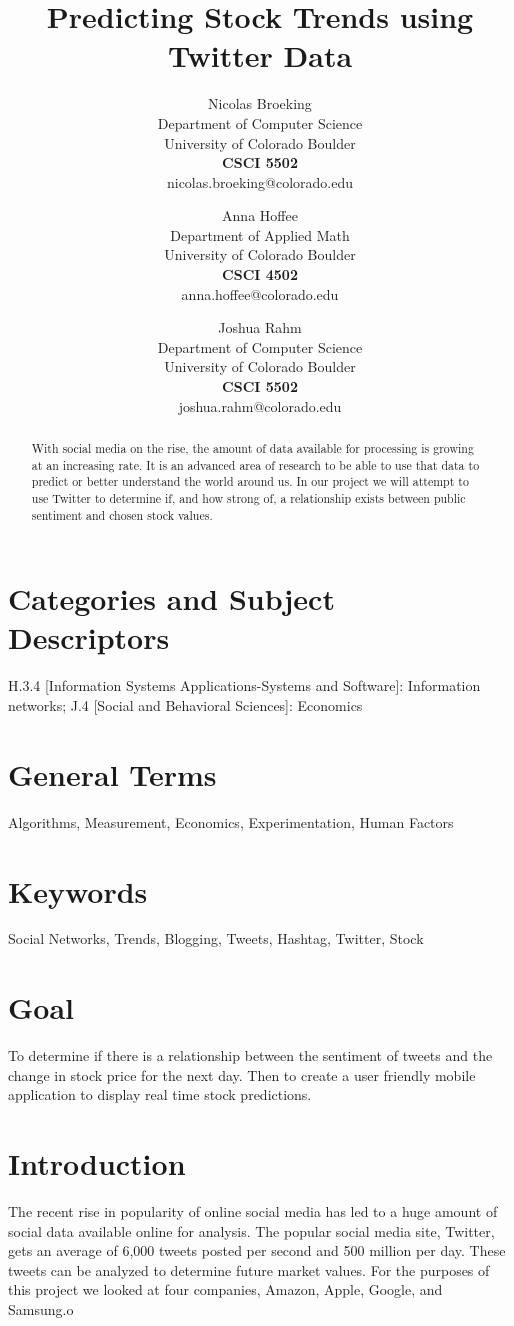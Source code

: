 \documentclass{acm_proc_article-sp}
\title{Predicting Stock Trends using Twitter Data}
\author{
    Nicolas Broeking \\
    \small Department of Computer Science \\
    \small University of Colorado Boulder \\
    \small \textbf{CSCI 5502} \\
    \small nicolas.broeking@colorado.edu \\
    \and
    Anna Hoffee \\
    \small Department of Applied Math \\
    \small University of Colorado Boulder \\
    \small \textbf{CSCI 4502} \\
    \small anna.hoffee@colorado.edu \\
    \and
    Joshua Rahm \\
    \small Department of Computer Science \\
    \small University of Colorado Boulder \\
    \small \textbf{CSCI 5502} \\
    \small joshua.rahm@colorado.edu \\
}
\begin{document}
\maketitle

\begin{abstract}
With social media on the rise, the amount of data available for processing is
growing at an increasing rate. It is an advanced area of research to be able to
use that data to predict or better understand the world around us. In our
project we will attempt to use Twitter to determine if, and how strong of, a
relationship exists between public sentiment and chosen stock values.

\end{abstract}

\section*{Categories and Subject\\ Descriptors}

H.3.4 [Information Systems Applications-Systems and Software]: Information
networks; J.4 [Social and Behavioral Sciences]: Economics

\section*{General Terms}
Algorithms, Measurement, Economics, Experimentation, Human Factors

\section*{Keywords}

Social Networks, Trends, Blogging, Tweets, Hashtag, Twitter, Stock

\section*{Goal}

To determine if there is a relationship between the sentiment of tweets and the
change in stock price for the next day. Then to create a user friendly mobile
application to display real time stock predictions.

\section{Introduction}

The recent rise in popularity of online social media has led to a huge amount
of social data available online for analysis. The popular social media site,
Twitter, gets an average of 6,000 tweets posted per second and 500 million per
day. These tweets can be analyzed to determine future market values. For the
purposes of this project we looked at four companies, Amazon, Apple, Google,
and Samsung.o  
\end{document}
